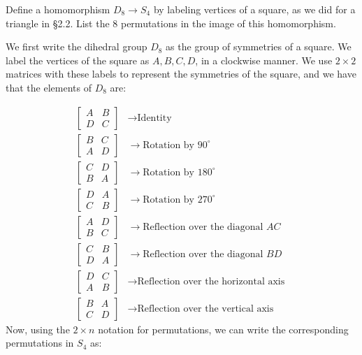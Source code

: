 Define a homomorphism $D_8 \to S_4$ by labeling vertices of a square, as we did for a triangle in §2.2. List the 8 permutations in the image of this homomorphism.

We first write the dihedral group $D_8$ as the group of symmetries of a square. We label the vertices of the square as $A, B, C, D$, in a clockwise manner. We use $2\times2$ matrices with these labels to represent the symmetries of the square, and we have that the elements of $D_8$ are:

$$
\begin{aligned}
\begin{bmatrix}
A & B \\
D & C
\end{bmatrix} & \rightarrow \text{Identity} \\
\begin{bmatrix}
B & C \\
A & D
\end{bmatrix} & \rightarrow \text{Rotation by } 90^\circ \\
\begin{bmatrix}
C & D \\
B & A
\end{bmatrix} & \rightarrow \text{Rotation by } 180^\circ \\
\begin{bmatrix}
D & A \\
C & B
\end{bmatrix} & \rightarrow \text{Rotation by } 270^\circ \\
\begin{bmatrix}
A & D \\
B & C
\end{bmatrix} & \rightarrow \text{Reflection over the diagonal } AC \\
\begin{bmatrix}
C & B \\
D & A
\end{bmatrix} & \rightarrow \text{Reflection over the diagonal } BD \\
\begin{bmatrix}
D & C \\
A & B
\end{bmatrix} & \rightarrow \text{Reflection over the horizontal axis } \\
\begin{bmatrix}
B & A \\
C & D
\end{bmatrix} & \rightarrow \text{Reflection over the vertical axis }
\end{aligned}
$$
Now, using the $2 \times n$ notation for permutations, we can write the corresponding permutations in $S_4$ as:

